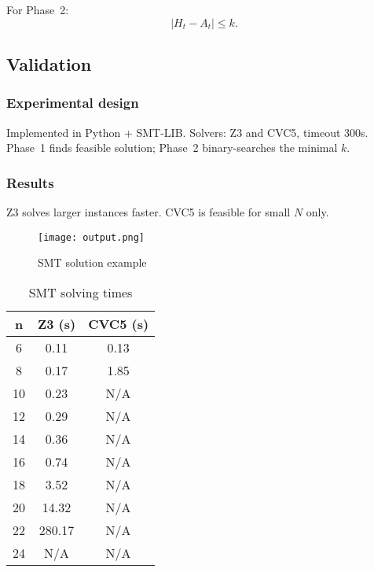 For Phase~2:
\[
|H_t - A_t| \leq k.
\]

\subsection{Validation}

\subsubsection{Experimental design}

Implemented in Python + SMT-LIB. Solvers: Z3 and CVC5, timeout 300s. Phase~1 finds feasible solution; Phase~2 binary-searches the minimal $k$.

\subsubsection{Results}

Z3 solves larger instances faster. CVC5 is feasible for small $N$ only.

\begin{figure}[h!]
  \centering
  \texttt{[image: output.png]}
  \caption{SMT solution example}
  \label{fig:smt-result}
\end{figure}

\begin{table}[htbp]
\centering
\small
\begin{tabular}{|c|c|c|}
\toprule
\textbf{n} & \textbf{Z3 (s)} & \textbf{CVC5 (s)} \\
\midrule
6  & 0.11 & 0.13 \\
8  & 0.17 & 1.85 \\
10 & 0.23 & N/A \\
12 & 0.29 & N/A \\
14 & 0.36 & N/A \\
16 & 0.74 & N/A \\
18 & 3.52 & N/A \\
20 & 14.32 & N/A \\
22 & 280.17 & N/A \\
24 & N/A & N/A \\
\bottomrule
\end{tabular}
\caption{SMT solving times}
\label{table:smt-result}
\end{table}
